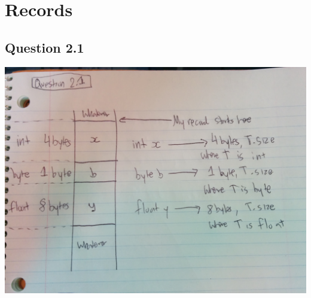 \documentclass[11pt, oneside]{article}   	%
\begin{document}
\newpage

\section{Records}
\subsection*{Question 2.1}
\includegraphics[scale=0.15]{IMG_20141011_151020.jpg}

\newpage
\end{document}
